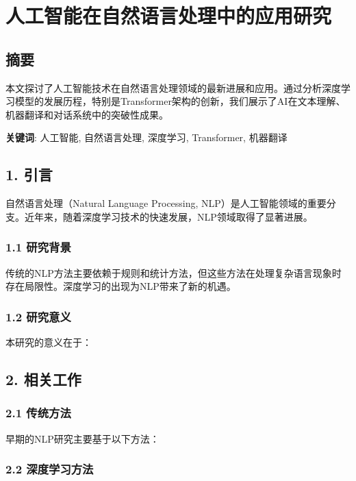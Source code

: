 \documentclass[UTF8, a4paper, 11pt]{ctexart}
\begin{document}
\section{人工智能在自然语言处理中的应用研究}


\subsection{摘要}


本文探讨了人工智能技术在自然语言处理领域的最新进展和应用。通过分析深度学习模型的发展历程，特别是Transformer架构的创新，我们展示了AI在文本理解、机器翻译和对话系统中的突破性成果。


\textbf{关键词}: 人工智能, 自然语言处理, 深度学习, Transformer, 机器翻译


\subsection{1. 引言}


自然语言处理（Natural Language Processing, NLP）是人工智能领域的重要分支。近年来，随着深度学习技术的快速发展，NLP领域取得了显著进展。


\subsubsection{1.1 研究背景}


传统的NLP方法主要依赖于规则和统计方法，但这些方法在处理复杂语言现象时存在局限性。深度学习的出现为NLP带来了新的机遇。


\subsubsection{1.2 研究意义}


本研究的意义在于：

\subsection{2. 相关工作}


\subsubsection{2.1 传统方法}


早期的NLP研究主要基于以下方法：


\subsubsection{2.2 深度学习方法}
\end{document}
